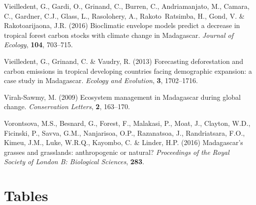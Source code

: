 \documentclass[a4paper, 12pt, leqno]{article} %
\begin{document}
\begin{thebibliography}{55}
Vieilledent, G., Gardi, O., Grinand, C., Burren, C., Andriamanjato, M., Camara,
  C., Gardner, C.J., Glass, L., Rasolohery, A., Rakoto~Ratsimba, H., Gond, V.
  \& Rakotoarijaona, J.R. (2016) {Bioclimatic envelope models predict a
  decrease in tropical forest carbon stocks with climate change in Madagascar}.
\newblock \emph{Journal of Ecology}, \textbf{104}, 703--715.

Vieilledent, G., Grinand, C. \& Vaudry, R. (2013) {Forecasting deforestation
  and carbon emissions in tropical developing countries facing demographic
  expansion: a case study in Madagascar}.
\newblock \emph{Ecology and Evolution}, \textbf{3}, 1702--1716.

Virah-Sawmy, M. (2009) {Ecosystem management in Madagascar during global
  change}.
\newblock \emph{Conservation Letters}, \textbf{2}, 163--170.

Vorontsova, M.S., Besnard, G., Forest, F., Malakasi, P., Moat, J., Clayton,
  W.D., Ficinski, P., Savva, G.M., Nanjarisoa, O.P., Razanatsoa, J.,
  Randriatsara, F.O., Kimeu, J.M., Luke, W.R.Q., Kayombo, C. \& Linder, H.P.
  (2016) {Madagascar's grasses and grasslands: anthropogenic or natural?}
\newblock \emph{Proceedings of the Royal Society of London B: Biological
  Sciences}, \textbf{283}.

\end{thebibliography}


\newpage

\section{Tables}
\label{tables}

\nopagebreak
\end{document}
